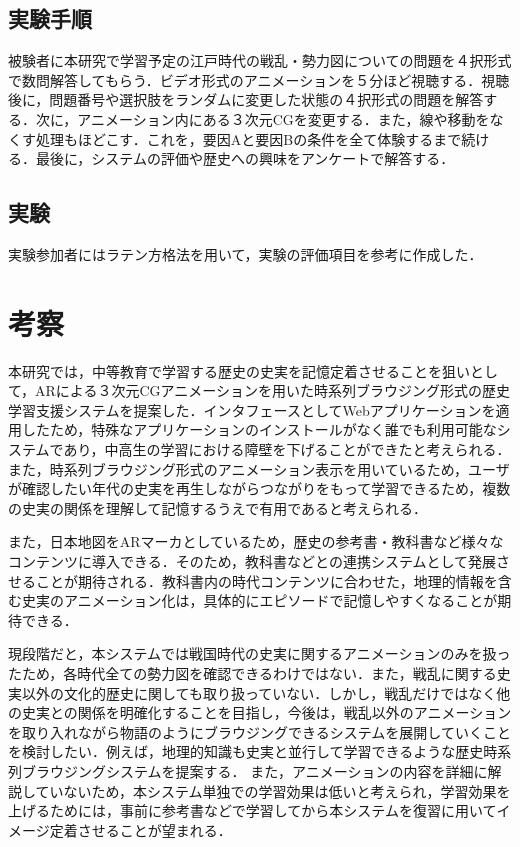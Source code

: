 \documentclass[a4paper,dvipdfmx]{hisken}
\begin{document}
\subsection{実験手順}
被験者に本研究で学習予定の江戸時代の戦乱・勢力図についての問題を４択形式で数問解答してもらう．ビデオ形式のアニメーションを５分ほど視聴する．視聴後に，問題番号や選択肢をランダムに変更した状態の４択形式の問題を解答する．次に，アニメーション内にある３次元CGを変更する．また，線や移動をなくす処理もほどこす．これを，要因Aと要因Bの条件を全て体験するまで続ける．最後に，システムの評価や歴史への興味をアンケートで解答する．


\subsection{実験}
実験参加者にはラテン方格法\cite{laten}を用いて，実験の評価項目を参考に作成した．



\section{考察}

本研究では，中等教育で学習する歴史の史実を記憶定着させることを狙いとして，ARによる３次元CGアニメーションを用いた時系列ブラウジング形式の歴史学習支援システムを提案した．インタフェースとしてWebアプリケーションを適用したため，特殊なアプリケーションのインストールがなく誰でも利用可能なシステムであり，中高生の学習における障壁を下げることができたと考えられる．また，時系列ブラウジング形式のアニメーション表示を用いているため，ユーザが確認したい年代の史実を再生しながらつながりをもって学習できるため，複数の史実の関係を理解して記憶するうえで有用であると考えられる．

また，日本地図をARマーカとしているため，歴史の参考書・教科書など様々なコンテンツに導入できる．そのため，教科書などとの連携システムとして発展させることが期待される．教科書内の時代コンテンツに合わせた，地理的情報を含む史実のアニメーション化は，具体的にエピソードで記憶しやすくなることが期待できる．

現段階だと，本システムでは戦国時代の史実に関するアニメーションのみを扱ったため，各時代全ての勢力図を確認できるわけではない．また，戦乱に関する史実以外の文化的歴史に関しても取り扱っていない．しかし，戦乱だけではなく他の史実との関係を明確化することを目指し，今後は，戦乱以外のアニメーションを取り入れながら物語のようにブラウジングできるシステムを展開していくことを検討したい．例えば，地理的知識も史実と並行して学習できるような歴史時系列ブラウジングシステムを提案する．
また，アニメーションの内容を詳細に解説していないため，本システム単独での学習効果は低いと考えられ，学習効果を上げるためには，事前に参考書などで学習してから本システムを復習に用いてイメージ定着させることが望まれる．
\end{document}
